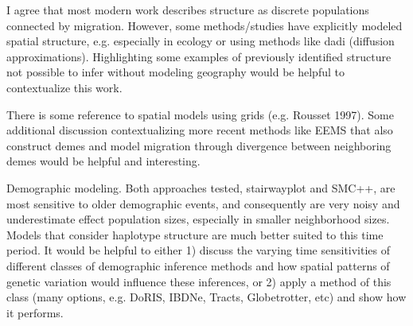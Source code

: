 
\begin{point}{}
    I agree that most modern work describes structure as discrete populations connected by migration. However, some methods/studies have explicitly modeled spatial structure, e.g. especially in ecology or using methods like dadi (diffusion approximations). Highlighting some examples of previously identified structure not possible to infer without modeling geography would be helpful to contextualize this work.
\end{point}


\begin{point}{}
    There is some reference to spatial models using grids (e.g. Rousset 1997). Some additional discussion contextualizing more recent methods like EEMS that also construct demes and model migration through divergence between neighboring demes would be helpful and interesting.
\end{point}


\begin{point}{}
    Demographic modeling. Both approaches tested, stairwayplot and SMC++, are most sensitive to older demographic events, and consequently are very noisy and underestimate effect population sizes, especially in smaller neighborhood sizes. Models that consider haplotype structure are much better suited to this time period. It would be helpful to either 1) discuss the varying time sensitivities of different classes of demographic inference methods and how spatial patterns of genetic variation would influence these inferences, or 2) apply a method of this class (many options, e.g. DoRIS, IBDNe, Tracts, Globetrotter, etc) and show how it performs.
\end{point}

